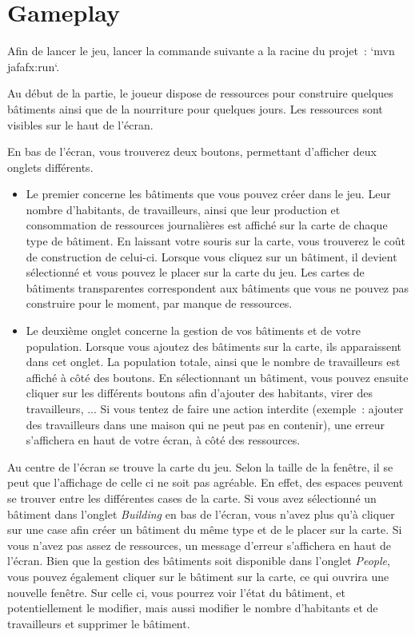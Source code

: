\documentclass{article}
\begin{document}
\section{Gameplay}

Afin de lancer le jeu, lancer la commande suivante a la racine du projet : `mvn jafafx:run`.


Au début de la partie, le joueur dispose de ressources pour construire quelques bâtiments ainsi
que de la nourriture pour quelques jours. Les ressources sont visibles sur le haut de l'écran.


En bas de l'écran, vous trouverez deux boutons, permettant d'afficher deux onglets différents.
\begin{itemize}
\item Le premier concerne les bâtiments que vous pouvez créer dans le jeu. Leur nombre d'habitants, de travailleurs,
ainsi que leur production et consommation de ressources journalières est affiché sur la carte de chaque type de bâtiment.
En laissant votre souris sur la carte, vous trouverez le coût de construction de celui-ci.
Lorsque vous cliquez sur un bâtiment, il devient sélectionné et vous pouvez le placer sur la carte du jeu.
Les cartes de bâtiments transparentes correspondent aux bâtiments que vous ne pouvez pas construire pour le moment,
par manque de ressources.
\item Le deuxième onglet concerne la gestion de vos bâtiments et de votre population. Lorsque vous ajoutez
des bâtiments sur la carte, ils apparaissent dans cet onglet. La population totale, ainsi que
le nombre de travailleurs est affiché à côté des boutons. En sélectionnant un bâtiment, vous pouvez ensuite
cliquer sur les différents boutons afin d'ajouter des habitants, virer des travailleurs, ...
Si vous tentez de faire une action interdite (exemple : ajouter des travailleurs dans une maison qui ne peut pas en contenir),
une erreur s'affichera en haut de votre écran, à côté des ressources.
\end{itemize}

Au centre de l'écran se trouve la carte du jeu. Selon la taille de la fenêtre, il se peut
que l'affichage de celle ci ne soit pas agréable. En effet, des espaces peuvent se trouver
entre les différentes cases de la carte.
Si vous avez sélectionné un bâtiment dans l'onglet \textit{Building} en bas de l'écran, vous n'avez plus qu'à cliquer sur une case
afin créer un bâtiment du même type et de le placer sur la carte. Si vous n'avez pas assez de ressources,
un message d'erreur s'affichera en haut de l'écran. Bien que la gestion des bâtiments soit disponible
dans l'onglet \textit{People}, vous pouvez également cliquer sur le bâtiment sur la carte, ce qui ouvrira une 
nouvelle fenêtre. Sur celle ci, vous pourrez voir l'état du bâtiment, et potentiellement le modifier, mais aussi modifier le nombre
d'habitants et de travailleurs et supprimer le bâtiment.
\end{document}
